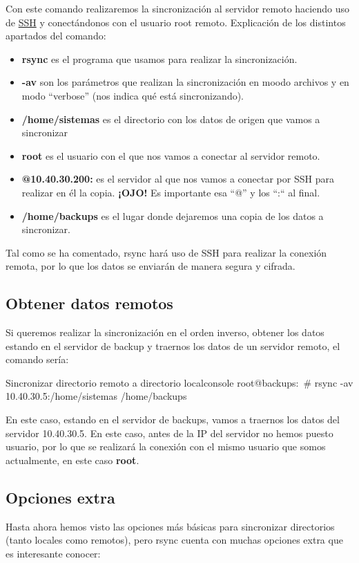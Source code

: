 Con este comando realizaremos la sincronización al servidor remoto haciendo uso de \hyperlink{ssh_server}{SSH} y conectándonos con el usuario root remoto. Explicación de los distintos apartados del comando:
\begin{itemize}
    \item \textbf{rsync} es el programa que usamos para realizar la sincronización.
    \item \textbf{-av} son los parámetros que realizan la sincronización en moodo archivos y en modo “verbose” (nos indica qué está sincronizando).
    \item \textbf{/home/sistemas} es el directorio con los datos de origen que vamos a sincronizar
    \item \textbf{root} es el usuario con el que nos vamos a conectar al servidor remoto.
    \item \textbf{@10.40.30.200:} es el servidor al que nos vamos a conectar por SSH para realizar en él la copia. \textbf{¡OJO!} Es importante esa “@” y los “:“ al final.
    \item \textbf{/home/backups} es el lugar donde dejaremos una copia de los datos a sincronizar.
\end{itemize}

Tal como se ha comentado, rsync hará uso de SSH para realizar la conexión remota, por lo que los datos se enviarán de manera segura y cifrada.

\subsection{Obtener datos remotos}
Si queremos realizar la sincronización en el orden inverso, obtener los datos estando en el servidor de backup y traernos los datos de un servidor remoto, el comando sería:

\begin{mycode}{Sincronizar directorio remoto a directorio local}{console}{}
root@backups:~# rsync -av 10.40.30.5:/home/sistemas  /home/backups
\end{mycode}

En este caso, estando en el servidor de backups, vamos a traernos los datos del servidor 10.40.30.5. En este caso, antes de la IP del servidor no hemos puesto usuario, por lo que se realizará la conexión con el mismo usuario que somos actualmente, en este caso \textbf{root}.

\subsection{Opciones extra}
Hasta ahora hemos visto las opciones más básicas para sincronizar directorios (tanto locales como remotos), pero rsync cuenta con muchas opciones extra que es interesante conocer:


